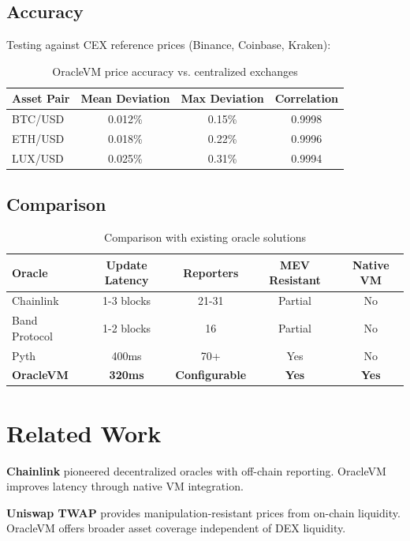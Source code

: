 \documentclass[11pt,a4paper]{article}
\theoremstyle{definition}
\begin{document}
\subsection{Accuracy}

Testing against CEX reference prices (Binance, Coinbase, Kraken):

\begin{table}[h]
\centering
\begin{tabular}{@{}lccc@{}}
\toprule
Asset Pair & Mean Deviation & Max Deviation & Correlation \\
\midrule
BTC/USD & 0.012\% & 0.15\% & 0.9998 \\
ETH/USD & 0.018\% & 0.22\% & 0.9996 \\
LUX/USD & 0.025\% & 0.31\% & 0.9994 \\
\bottomrule
\end{tabular}
\caption{OracleVM price accuracy vs. centralized exchanges}
\end{table}

\subsection{Comparison}

\begin{table}[h]
\centering
\begin{tabular}{@{}lcccc@{}}
\toprule
Oracle & Update Latency & Reporters & MEV Resistant & Native VM \\
\midrule
Chainlink & 1-3 blocks & 21-31 & Partial & No \\
Band Protocol & 1-2 blocks & 16 & Partial & No \\
Pyth & 400ms & 70+ & Yes & No \\
\textbf{OracleVM} & \textbf{320ms} & \textbf{Configurable} & \textbf{Yes} & \textbf{Yes} \\
\bottomrule
\end{tabular}
\caption{Comparison with existing oracle solutions}
\end{table}

\section{Related Work}

\textbf{Chainlink} pioneered decentralized oracles with off-chain reporting. OracleVM improves latency through native VM integration.

\textbf{Uniswap TWAP} provides manipulation-resistant prices from on-chain liquidity. OracleVM offers broader asset coverage independent of DEX liquidity.
\end{document}
